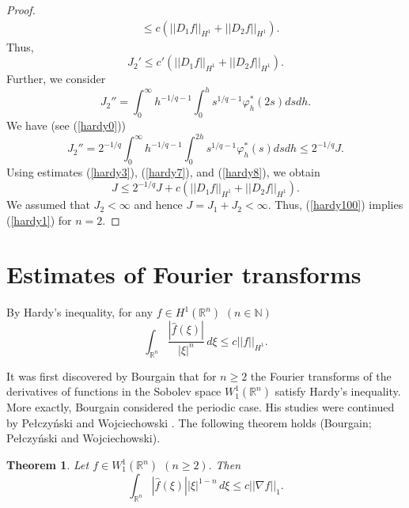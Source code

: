 \documentclass[12pt,twoside,reqno]{amsart}
\numberwithin{equation}{section}
\newtheorem{teo}{Theorem}[section]
\theoremstyle{definition}
\numberwithin{equation}{section}
\def\R{\mathbb{R}}
\def\N{\mathbb{N}}
\def\f{\varphi}
\begin{document}
\begin{proof}
$$\begin{aligned}
&\le c(||D_1f||_{H^1}+||D_2f||_{H^1}).
\end{aligned}
$$
Thus,
\begin{equation}\label{hardy7}
J_2'\le c'(||D_1f||_{H^1}+||D_2f||_{H^1}).
\end{equation}
Further, we consider
$$
J_2''=\int_0^\infty h^{-1/q-1}\int_0^h s^{1/q-1}\f_h^*(2s)dsdh.
$$
We have (see (\ref{hardy0}))
\begin{equation}\label{hardy8}
J_2''= 2^{-1/q}\int_0^\infty h^{-1/q-1}\int_0^{2h} s^{1/q-1}\f_h^*(s)dsdh
\le 2^{-1/q}J.
\end{equation}
Using estimates (\ref{hardy3}), (\ref{hardy7}), and (\ref{hardy8}),  we obtain
\begin{equation}\label{hardy100}
J\le 2^{-1/q}J + c(||D_1f||_{H^1}+||D_2f||_{H^1}).
\end{equation}
We assumed that $J_2<\infty$ and hence $J=J_1+J_2<\infty.$ Thus, (\ref{hardy100})  implies (\ref{hardy1}) for $n=2.$





\end{proof}












\vskip 6pt
\section{Estimates of Fourier transforms}






By Hardy's inequality, for any $f\in H^1(\R^n)$ $(n\in\N)$
\begin{equation}\label{H_ineq}
\int_{\R^n} \frac{|\widehat{f}(\xi)|}{|\xi|^n}\,d\xi\le c||f||_{H^1}.
\end{equation}

\vskip 4pt

 It was first discovered by Bourgain \cite{Bour1}  that for
$n\ge 2$ the Fourier transforms of the derivatives of
functions in the Sobolev space $W_1^1(\R^n)$ satisfy Hardy's
inequality. More exactly, Bourgain considered the periodic case.
His studies were continued by Pe\l czy\'nski and  Wojciechowski
\cite{PeWo}. The following theorem holds (Bourgain; Pe\l czy\'nski and  Wojciechowski).

\vskip 4pt
\begin{teo}\label{Pelcz} Let $f\in W_1^1(\R^n)$ $(n\ge 2).$ Then
\begin{equation}\label{pelcz}
\int_{\R^n} |\widehat{f}(\xi)||\xi|^{1-n}\,d\xi\le c
||\nabla f||_1.
\end{equation}
\end{teo}
\vskip 4pt
\end{document}
